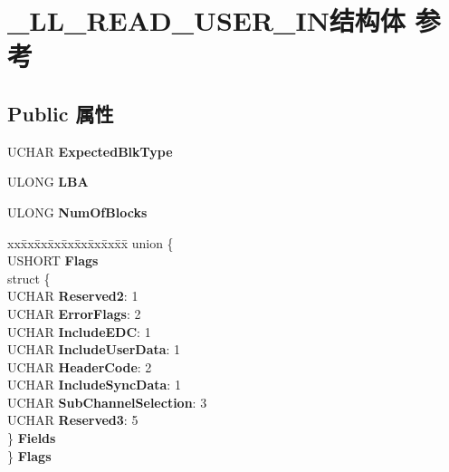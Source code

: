 \hypertarget{struct___l_l___r_e_a_d___u_s_e_r___i_n}{}\section{\+\_\+\+L\+L\+\_\+\+R\+E\+A\+D\+\_\+\+U\+S\+E\+R\+\_\+\+I\+N结构体 参考}
\label{struct___l_l___r_e_a_d___u_s_e_r___i_n}
\subsection*{Public 属性}
\begin{DoxyCompactItemize}
\item 
\mbox{\label{struct___l_l___r_e_a_d___u_s_e_r___i_n_a345e8b1d4c787ee36e4c364d2340b0d0}} 
U\+C\+H\+AR {\bfseries Expected\+Blk\+Type}
\item 
\mbox{\label{struct___l_l___r_e_a_d___u_s_e_r___i_n_a32b7f35dd774f885b5a448bdd075472b}} 
U\+L\+O\+NG {\bfseries L\+BA}
\item 
\mbox{\label{struct___l_l___r_e_a_d___u_s_e_r___i_n_a2c55368f57720c6a6e82309f9f7acff5}} 
U\+L\+O\+NG {\bfseries Num\+Of\+Blocks}
\item 
\mbox{\label{struct___l_l___r_e_a_d___u_s_e_r___i_n_a0ac21106f12fb64a833d9f6c6999e502}} 
\begin{tabbing}
xx\=xx\=xx\=xx\=xx\=xx\=xx\=xx\=xx\=\kill
union \{\\
\>USHORT {\bfseries Flags}\\
\>struct \{\\
\>\>UCHAR {\bfseries Reserved2}: 1\\
\>\>UCHAR {\bfseries ErrorFlags}: 2\\
\>\>UCHAR {\bfseries IncludeEDC}: 1\\
\>\>UCHAR {\bfseries IncludeUserData}: 1\\
\>\>UCHAR {\bfseries HeaderCode}: 2\\
\>\>UCHAR {\bfseries IncludeSyncData}: 1\\
\>\>UCHAR {\bfseries SubChannelSelection}: 3\\
\>\>UCHAR {\bfseries Reserved3}: 5\\
\>\} {\bfseries Fields}\\
\} {\bfseries Flags}\\


\end{tabbing}
\end{DoxyCompactItemize}
